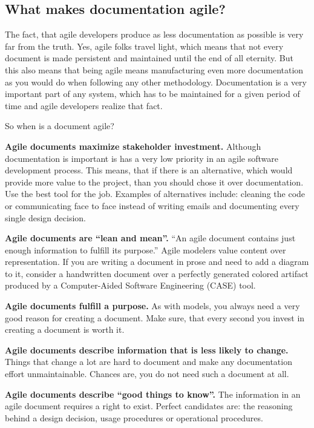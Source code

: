 \subsection{What makes documentation agile?}
The fact, that agile developers produce as less documentation as possible is
very far from the truth. Yes, agile folks travel light, which means that not
every document is made persistent and maintained until the end of all eternity.
But this also means that being agile means manufacturing even more documentation
as you would do when following any other methodology. Documentation is a very
important part of any system, which has to be maintained for a given period of
time and agile developers realize that fact.

So when is a document agile?
\begin{description}
\item {\bf Agile documents maximize stakeholder investment.} Although
documentation is important is has a very low priority in an agile software development
process. This means, that if there is an alternative, which would provide more
value to the project, than you should chose it over documentation. Use the best
tool for the job. Examples of alternatives include: cleaning the code or
communicating face to face instead of writing emails and documenting every
single design decision.
\item {\bf Agile documents are \enquote{lean and mean}.} \enquote{An agile
document contains just enough information to fulfill its purpose.}\cite{Ambler200204} Agile modelers value
content over representation. If you are writing a document in prose and need to
add a diagram to it, consider a handwritten document over a perfectly generated
colored artifact produced by a Computer-Aided Software Engineering (CASE) tool.
\item {\bf Agile documents fulfill a purpose.} As with models, you always need
a very good reason for creating a document. Make sure, that every second you
invest in creating a document is worth it.
\item {\bf Agile documents describe information that is less likely to change.}
Things that change a lot are hard to document and make any documentation effort
unmaintainable. Chances are, you do not need such a document at all.
\item {\bf Agile documents describe \enquote{good things to know}.} The
information in an agile document requires a right to exist. Perfect candidates are: the
reasoning behind a design decision, usage procedures or operational procedures.

\end{description}
